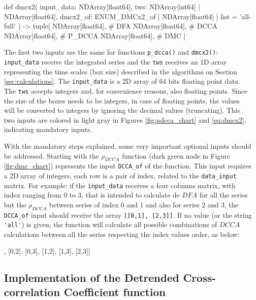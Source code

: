 \documentclass[article]{jss}
\begin{document}
\begin{Code}
def dmcx2(
    input_data: NDArray[float64],
    tws: NDArray[int64] | NDArray[float64],
    dmcx2_of: ENUM_DMCx2_of | NDArray[float64] | list = 'all-full'
) -> tuple[ NDArray[float64],   # DFA
            NDArray[float64],   # DCCA
            NDArray[float64],   # P_DCCA
            NDArray[float64],   # DMC
          ]
  \end{Code}

The first two inputs are the same for functions \verb"p_dcca()" and \verb"dmcx2()": \verb"input_data" receive the integrated series and the \verb"tws" receives an 1D array representing the time scales (box size) described in the algorithms on Section \ref{sec:calculations}. The \verb"input_data" is a 2D array of 64 bits floating point data. The \verb"tws" accepts integers and, for convenience reasons, also floating points. Since the size of the boxes needs to be integers, in case of floating points, the values will be converted to integers by ignoring the decimal values (truncating). This two inputs are colored in light gray in Figures \ref{fig:pdcca_chart} and \ref{eq:dmcx2}, indicating mandatory inputs.

With the mandatory steps explained, some very important optional inputs should be addressed. Starting with the $\rho_{DCCA}$ function (dark green node in Figure \ref{fig:dmc_chart}) represents the input \verb"DCCA_of" of the function. This input requires a 2D array of integers, each row is a pair of index, related to the \verb"data_input" matrix. For example: if the \verb"input_data" receives a four columns matrix, with index ranging from $0$ to $3$, that is intended to calculate de $DFA$ for all the series but the $\rho_{DCCA}$ between series of index $0$ and $1$ and also for series $2$ and $3$, the \verb"DCCA_of" input should receive the array \verb"[[0,1], [2,3]]". If no value (or the string \verb"'all'") is given, the function will calculate all possible combinations of $DCCA$ calculations between all the series respecting the index values order, as below:

\begin{Code}
[[0,1], [0,2], [0,3], [1,2], [1,3], [2,3]]
\end{Code}

\subsection{Implementation of the Detrended Cross-correlation Coefficient function}
\end{document}
